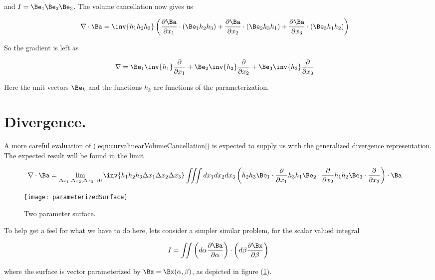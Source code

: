 and $I = \Be_1 \Be_2 \Be_3$.  The volume cancellation now gives us

\begin{align}\label{eqn:curvalinearVolumeCancellation}
\grad \cdot \Ba &=
\inv{h_1 h_2 h_3} \left(
  \PD{x_1}{\Ba} \cdot (\Be_1 h_2 h_3 )
+ \PD{x_2}{\Ba} \cdot (\Be_2 h_3 h_1 )
+ \PD{x_3}{\Ba} \cdot (\Be_3 h_1 h_2 )  \right)
\end{align}

So the gradient is left as

\begin{align}\label{eqn:gradientCurva}
\grad &=
 \Be_1 \inv{h_1} \PD{x_1}{}
+\Be_2 \inv{h_2} \PD{x_2}{}
+\Be_3 \inv{h_3} \PD{x_3}{}
\end{align}

Here the unit vectors $\Be_k$ and the functions $h_k$ are functions of the parameterization.

\section{Divergence.}

A more careful evaluation of (\ref{eqn:curvalinearVolumeCancellation}) is expected to supply us with the generalized divergence representation.  The expected result will be found in the limit

\begin{align}\label{eqn:foo1}
\grad \cdot \Ba &=
\lim_{
\Delta x_1, \Delta x_2, \Delta x_3 \rightarrow 0}
\inv{h_1 h_2 h_3 \Delta x_1 \Delta x_2 \Delta x_3
} \iiint dx_1 dx_2 dx_3 \left(
h_2 h_3 \Be_1 \cdot \PD{x_1}{}
h_3 h_1 \Be_2 \cdot \PD{x_2}{}
h_1 h_2 \Be_3 \cdot \PD{x_3}{} \right) \cdot \Ba
\end{align}

\begin{figure}[htp]
\centering
\texttt{[image: parameterizedSurface]}
\caption{Two parameter surface.}\label{fig:parameterizedSurface}
\end{figure}

To help get a feel for what we have to do here, lets consider a simpler similar problem, for the scalar valued integral

\begin{align*}
I = \iint \left( d\alpha \PD{\alpha}{\Ba} \right) \cdot \left( d\beta \PD{\beta}{\Bx} \right)
\end{align*}

where the surface is vector parameterized by $\Bx = \Bx(\alpha, \beta)$, as depicted in figure (\ref{fig:parameterizedSurface}).

\EndNoBibArticle
